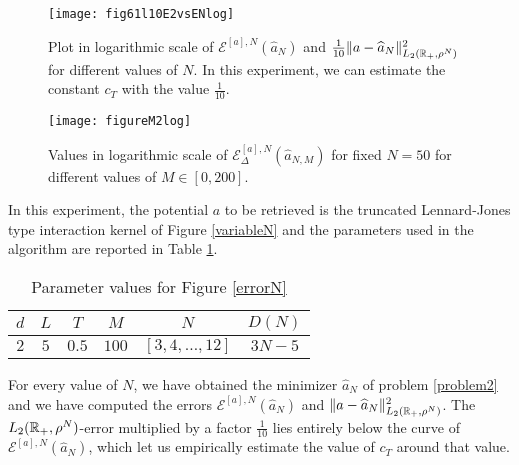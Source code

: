 \begin{figure}[h]
\hspace{-1.2cm}
\begin{minipage}{0.58\textwidth}
\begin{center}
\texttt{[image: fig61l10E2vsENlog]}
\end{center}
\caption{Plot in logarithmic scale of $\mathcal{E}^{[a],N}(\widehat{a}_N)$ and $\frac{1}{10}\|a-\widehat{a}_N\|^2_{L_2(\mathbb{R}_+,\rho^N)}$ for different values of $N$. In this experiment, we can estimate the constant $c_T$ with the value $\frac{1}{10}$.}\label{errorN}
\end{minipage}
\hspace{0.4cm}
\begin{minipage}{0.55\textwidth}
\begin{center}
\texttt{[image: figureM2log]}
\end{center}
\caption{Values in logarithmic scale of $\mathcal{E}^{[a],N}_\Delta(\widehat a_{N,M})$ for fixed $N = 50$ for different values of $M \in [0,200]$.}\label{Mconstr}
\end{minipage}
\end{figure}

In this experiment, the potential $a$ to be retrieved is the truncated Lennard-Jones type interaction kernel of Figure \ref{variableN} and the parameters used in the algorithm are reported in Table \ref{tab:fig3}.

\begin{table}[h]
\begin{center}
\begin{tabular}{ |c|c|c|c|c|c| }
\hline
  $d$ & $L$ & $T$ & $M$ & $N$ & $D(N)$ \\
\hline
\hline
  $2$ & $5$ & $0.5$ & $100$ & $[3,4,\ldots,12]$ & $3N-5$ \\
\hline
\end{tabular}
\end{center}
\vspace{-0.5cm}
\caption{Parameter values for Figure \ref{errorN}} \label{tab:fig3} 
\end{table}

For every value of $N$, we have obtained the minimizer $\widehat{a}_N$ of problem \eqref{problem2} and we have computed the errors $\mathcal{E}^{[a],N}(\widehat{a}_N)$ and $\|a-\widehat{a}_N\|^2_{L_2(\mathbb{R}_+,\rho^N)}$. The $L_2(\mathbb{R}_+,\rho^N)$-error multiplied by a factor $\frac{1}{10}$ lies entirely below the curve of $\mathcal{E}^{[a],N}(\widehat{a}_N)$, which let us empirically estimate the value of $c_T$ around that value.

